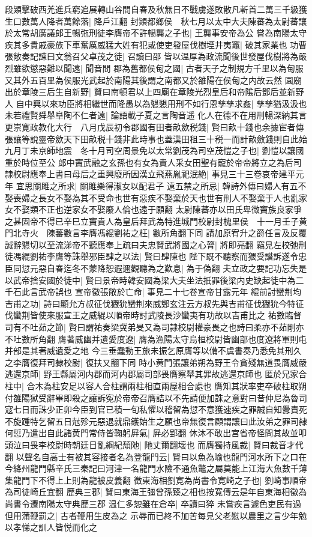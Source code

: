 段熲擊破西羌進兵窮追展轉山谷間自春及秋無日不戰虜遂敗散凡斬首二萬三千級獲生口數萬人降者萬餘落|{
	降戶江翻}
封熲都鄉侯　秋七月以太中大夫陳蕃為太尉蕃讓於太常胡廣議郎王暢㢮刑徒李膺帝不許暢龔之子也|{
	王龔事安帝為公}
嘗為南陽太守疾其多貴戚豪族下車奮厲威猛大姓有犯或使吏發屋伐樹堙井夷竈|{
	破其家業也}
功曹張敞奏記諫曰文翁召父卓茂之徒|{
	召讀曰邵}
皆以温厚為政流聞後世發屋伐樹將為嚴烈雖欲懲惡難以聞遠|{
	聞音問}
郡為舊都侯甸之國|{
	古者天子之制規方千里以為甸服又其外五百里為侯服光武起於南陽其後謂之南都又於雒陽在侯甸之内故云然}
園廟出於章陵三后生自新野|{
	賢曰南頓君以上四廟在章陵光烈皇后和帝隂后鄧后並新野人}
自中興以來功臣將相繼世而隆愚以為懇懇用刑不如行恩孳孳求姦|{
	孳孳猶汲汲也}
未若禮賢舜舉臯陶不仁者遠|{
	論語載子夏之言陶音遥}
化人在德不在用刑暢深納其言更崇寛政教化大行　八月戊辰初令郡國有田者畝歛税錢|{
	賢曰畝十錢也余據宦者傳張讓等說靈帝歛天下田畝税十錢非此時事也蓋漢田租三十税一而計畝斂錢則自此始}
九月丁未京師地震　冬十月司空周景免以太常劉茂為司空茂愷之子也|{
	劉愷以讓國重於時位至公}
郎中竇武融之玄孫也有女為貴人采女田聖有寵於帝帝將立之為后司隸校尉應奉上書曰母后之重興廢所因漢立飛燕胤祀泯絶|{
	事見三十三卷哀帝建平元年}
宜思關雎之所求|{
	關雎樂得淑女以配君子}
遠五禁之所忌|{
	韓詩外傳曰婦人有五不娶喪婦之長女不娶為其不受命也世有惡疾不娶棄於天也世有刑人不娶棄于人也亂家女不娶類不正也逆家女不娶廢人倫也遠于願翻}
太尉陳蕃亦以田氏卑微竇族良家爭之甚固帝不得已辛巳立竇貴人為皇后拜武為特進城門校尉封槐里侯　十一月壬子黄門北寺火　陳蕃數言李膺馮緄劉祐之枉|{
	數所角翻下同}
請加原宥升之爵任言及反覆誠辭懇切以至流涕帝不聽應奉上疏曰夫忠賢武將國之心膂|{
	將即亮翻}
竊見左校弛刑徒馮緄劉祐李膺等誅舉邪臣肆之以法|{
	賢曰肆陳也}
陛下既不聽察而猥受譖訴遂令忠臣同愆元惡自春迄冬不蒙降恕遐邇觀聽為之歎息|{
	為于偽翻}
夫立政之要記功忘失是以武帝捨安國於徒中|{
	賢曰景帝時韓安國為梁大夫坐法扺罪後梁内史缺起徒中為二千石此言武帝誤也}
宣帝徵張敞於亡命|{
	事見二十七卷宣帝甘露元年}
緄前討蠻荆均吉甫之功|{
	詩曰顯允方叔征伐玁狁蠻荆來威鄭玄注云方叔先與吉甫征伐玁狁今特征伐蠻荆皆使來服宣王之威緄以順帝時討武陵長沙蠻夷有功故以吉甫比之}
祐數臨督司有不吐茹之節|{
	賢曰謂祐奏梁冀弟旻又為司隷校尉權豪畏之也詩曰柔亦不茹剛亦不吐數所角翻}
膺著威幽并遺愛度遼|{
	膺為漁陽太守烏桓校尉皆幽部也度遼將軍則屯并部是其著威遺愛之地}
今三垂蠢動王旅未振乞原膺等以備不虞書奏乃悉免其刑久之李膺復拜司隸校尉|{
	復扶又翻下同}
時小黄門張讓弟朔為野王令貪殘無道畏膺威嚴逃還京師|{
	野王縣屬河内郡而河内郡屬司部畏膺察舉其罪故逃還京師也}
匿於兄家合柱中|{
	合木為柱安足以容人合柱謂兩柱相直兩屋相合處也}
膺知其狀率吏卒破柱取朔付雒陽獄受辭畢即殺之讓訴寃於帝帝召膺詰以不先請便加誅之意對曰昔仲尼為魯司寇七日而誅少正卯今臣到官已積一旬私懼以稽留為愆不意獲速疾之罪誠自知釁責死不旋踵特乞留五日尅殄元惡退就鼎鑊始生之願也帝無復言顧謂讓曰此汝弟之罪司隸何愆乃遣出自此諸黄門常侍皆鞠躬屛氣|{
	屛必郢翻}
休沐不敢出宫省帝怪問其故並叩頭泣曰畏李校尉時朝廷日亂綱紀頹阤|{
	阤丈爾翻壞也}
而膺獨持風裁|{
	賢曰裁音才代翻}
以聲名自高士有被其容接者名為登龍門云|{
	賢曰以魚為喻也龍門河水所下之口在今絳州龍門縣辛氏三秦記曰河津一名龍門水險不通魚鼈之屬莫能上江海大魚數千薄集龍門下不得上上則為龍被皮義翻}
徵東海相劉寛為尚書令寛崎之子也|{
	劉崎事順帝為司徒崎丘宜翻}
歷典三郡|{
	賢曰東海王彊曾孫臻之相也按寛傳云是年自東海相徵為尚書令遷南陽太守典歷三郡}
温仁多恕雖在倉卒|{
	卒讀曰猝}
未嘗疾言遽色吏民有過但用蒲鞭罰之|{
	古者鞭用生皮為之}
示辱而已終不加苦每見父老慰以農里之言少年勉以孝悌之訓人皆悦而化之


